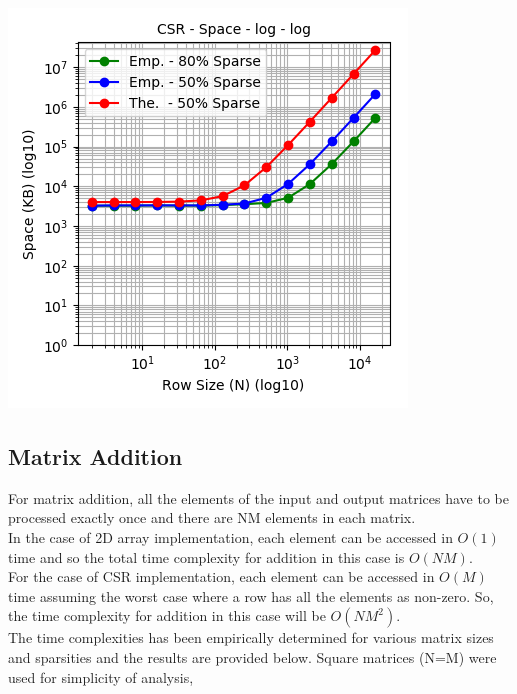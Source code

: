 \documentclass[11pt,a4paper,oneside]{article}
\begin{document}
	\begin{center}
		\includegraphics[scale=0.6]{2.png}		
	\end{center}

    \subsection{Matrix Addition}
    For matrix addition, all the elements of the input and output matrices have to be processed exactly once and there are NM elements in each matrix. \\
    \newline
    In the case of 2D array implementation, each element can be accessed in $O(1)$ time and so the total time complexity for addition in this case is $O(NM)$. \\
    \newline
    For the case of CSR implementation, each element can be accessed in $O(M)$ time assuming the worst case where a row has all the elements as non-zero. So, the time complexity for addition in this case will be $O(NM^2)$. \\   
    \newline
    The time complexities has been empirically determined for various matrix sizes and sparsities and the results are provided below. Square matrices (N=M) were used for simplicity of analysis,
    
\end{document}
